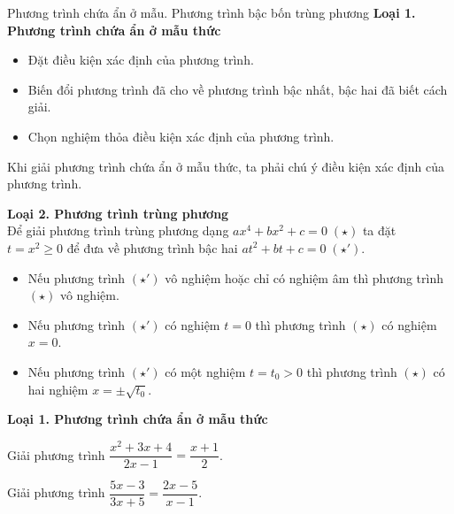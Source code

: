 \begin{dang}
	{Phương trình chứa ẩn ở mẫu. Phương trình bậc bốn trùng phương}
	\textbf{Loại 1. Phương trình chứa ẩn ở mẫu thức} 
	\begin{itemize}
		\item Đặt điều kiện xác định của phương trình.
		\item Biến đổi phương trình đã cho về phương trình bậc nhất, bậc hai đã biết cách giải.
		\item Chọn nghiệm thỏa điều kiện xác định của phương trình.
	\end{itemize}
\begin{note}
	Khi giải phương trình chứa ẩn ở mẫu thức, ta phải chú ý điều kiện xác định của phương trình.
\end{note}
	\textbf{Loại 2. Phương trình trùng phương}\\
	Để giải phương trình trùng phương dạng $ax^4+bx^2+c=0\;(\star)$ ta đặt $t=x^2\ge 0$ để đưa về phương trình bậc hai $at^2+bt+c=0\;(\star')$.
	\begin{itemize}
		\item Nếu phương trình $(\star')$ vô nghiệm hoặc chỉ có nghiệm âm thì phương trình $(\star)$ vô nghiệm.
		\item Nếu phương trình $(\star')$ có nghiệm $t=0$ thì phương trình $(\star)$ có nghiệm $x=0$.
		\item Nếu phương trình $(\star')$ có một nghiệm $t=t_0>0$ thì phương trình $(\star)$ có hai nghiệm $x=\pm\sqrt{t_0}$.
	\end{itemize}
\end{dang}

\noindent \textbf{Loại 1. Phương trình chứa ẩn ở mẫu thức}

\begin{vd}%
	Giải phương trình $\dfrac{x^2+3x+4}{2x-1}=\dfrac{x+1}{2}$.
\end{vd}

\begin{vd}%
	Giải phương trình $\dfrac{5x-3}{3x+5}=\dfrac{2x-5}{x-1}$.
\end{vd}

